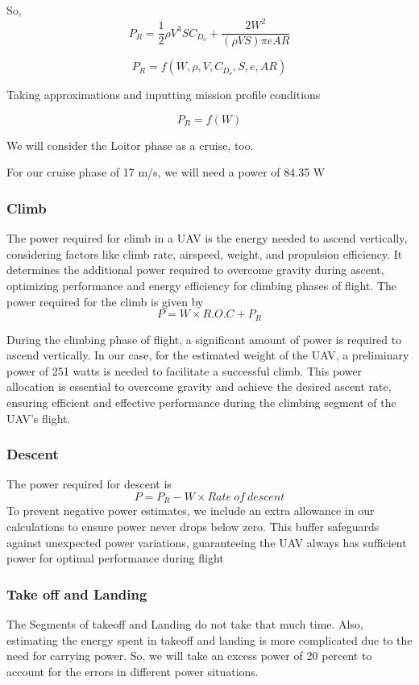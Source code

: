 \documentclass[12 pt]{article}
\begin{document}
So, 
$$ P_R = \frac{1}{2}\rho V^3 S C_{D_o} + \frac{2 W^2}{ (\rho V S) \pi e AR} $$

$$P_R = f(W,\rho,V,C_{D_o},S,e,AR)$$

Taking approximations and inputting mission profile conditions

$$ P_R = f(W) $$

We will consider the Loitor phase as a cruise, too.

For our cruise phase of 17 m/s, we will need a power of 84.35 W 

\subsubsection{{Climb} }
The power required for climb in a UAV is the energy needed to ascend vertically, considering factors like climb rate, airspeed, weight, and propulsion efficiency. It determines the additional power required to overcome gravity during ascent, optimizing performance and energy efficiency for climbing phases of flight.
The power required for the climb is given by 
$$ P = W \times R.O.C + P_R $$

During the climbing phase of flight, a significant amount of power is required to ascend vertically. In our case, for the estimated weight of the UAV, a preliminary power of 251 watts is needed to facilitate a successful climb. This power allocation is essential to overcome gravity and achieve the desired ascent rate, ensuring efficient and effective performance during the climbing segment of the UAV's flight.

\subsubsection{{Descent}}
The power required for descent is 
$$ P = P_R - W \times Rate\: of\: descent$$
To prevent negative power estimates, we include an extra allowance in our calculations to ensure power never drops below zero. This buffer safeguards against unexpected power variations, guaranteeing the UAV always has sufficient power for optimal performance during flight

\subsubsection{{Take off and Landing}}
The Segments of takeoff and Landing do not take that much time. Also, estimating the energy spent in takeoff and landing is more complicated due to the need for carrying power. So, we will take an excess power of 20 percent to account for the errors in different power situations.
\end{document}
